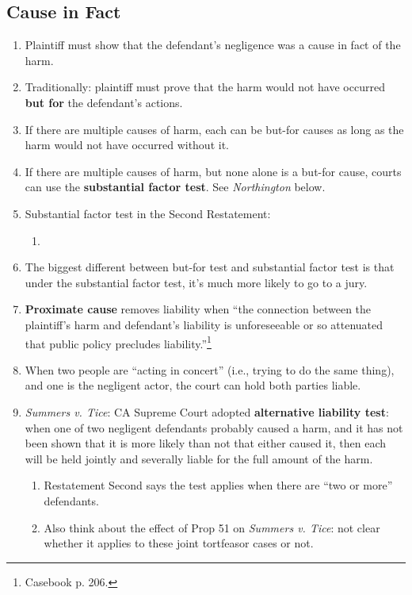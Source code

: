 \subsection{Cause in Fact}

\begin{enumerate}
    \item Plaintiff must show that the defendant's negligence was a cause in fact of the harm.
    \item Traditionally: plaintiff must prove that the harm would not have occurred \textbf{but for} the defendant's actions.
    \item If there are multiple causes of harm, each can be but-for causes as long as the harm would not have occurred without it.
    \item If there are multiple causes of harm, but none alone is a but-for cause, courts can use the \textbf{substantial factor test}. See \emph{Northington} below.
    \item Substantial factor test in the Second Restatement:
    \begin{enumerate}
        \item %
    \end{enumerate}
    \item The biggest different between but-for test and substantial factor test is that under the substantial factor test, it's much more likely to go to a jury.
    \item \textbf{Proximate cause} removes liability when ``the connection between the plaintiff's harm and defendant's liability is unforeseeable or so attenuated that public policy precludes liability.''\footnote{Casebook p. 206.}
    \item When two people are ``acting in concert'' (i.e., trying to do the same thing), and one is the negligent actor, the court can hold both parties liable.
    \item \emph{Summers v. Tice}: CA Supreme Court adopted \textbf{alternative liability test}: when one of two negligent defendants probably caused a harm, and it has not been shown that it is more likely than not that either caused it, then each will be held jointly and severally liable for the full amount of the harm.
    \begin{enumerate}
        \item Restatement Second says the test applies when there are ``two or more'' defendants.
        \item Also think about the effect of Prop 51 on \emph{Summers v. Tice}: not clear whether it applies to these joint tortfeasor cases or not.

\end{enumerate}
\end{enumerate}
